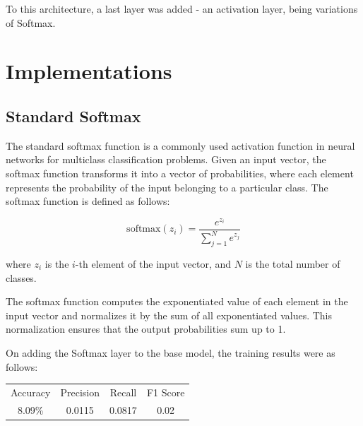 \documentclass{article}
\begin{document}
To this architecture, a last layer was added - an activation layer, being variations of Softmax.

\section{Implementations}

\subsection{Standard Softmax}

The standard softmax function is a commonly used activation function in neural networks for multiclass classification problems. Given an input vector, the softmax function transforms it into a vector of probabilities, where each element represents the probability of the input belonging to a particular class. The softmax function is defined as follows:

\[
\text{softmax}(z_i) = \frac{e^{z_i}}{\sum_{j=1}^{N}e^{z_j}}
\]

where \(z_i\) is the \(i\)-th element of the input vector, and \(N\) is the total number of classes.

The softmax function computes the exponentiated value of each element in the input vector and normalizes it by the sum of all exponentiated values. This normalization ensures that the output probabilities sum up to 1.


On adding the Softmax layer to the base model, the training results were as follows: \\

\begin{center}
\begin{tabular}{ |c|c|c|c| } 
 \hline
 Accuracy & Precision & Recall & F1 Score \\ 
 8.09\% & 0.0115 & 0.0817 & 0.02 \\
 \hline
\end{tabular}
\end{center}
\end{document}
